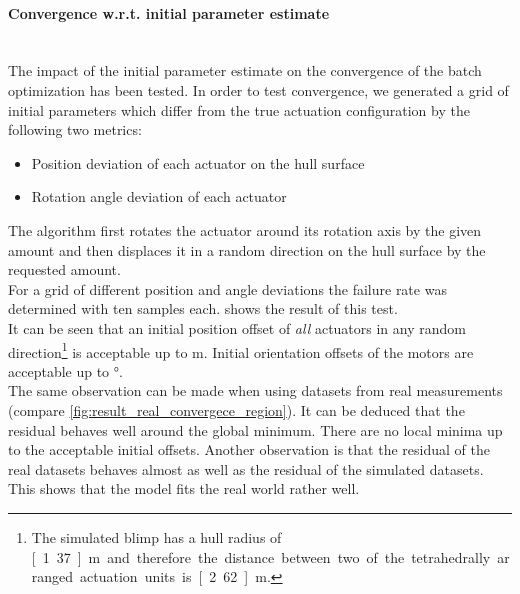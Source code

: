 \paragraph{Convergence w.r.t. initial parameter estimate} ~\\
The impact of the initial parameter estimate on the convergence of the batch optimization has been tested.
In order to test convergence, we generated a grid of initial parameters which differ from the true actuation configuration by the following two metrics:
\begin{itemize}
\item Position deviation of each actuator on the hull surface
\item Rotation angle deviation of each actuator
\end{itemize}
The algorithm first rotates the actuator around its rotation axis by the given amount and then displaces it in a random direction on the hull surface by the requested amount. \\
For a grid of different position and angle deviations the failure rate was determined with ten samples each.
 shows the result of this test.\\
It can be seen that an initial position offset of \textit{all} actuators in any random direction\footnote{
The simulated blimp has a hull radius of \unit[1.37]{m} and therefore the distance between two of the tetrahedrally arranged actuation units is \unit[2.62]{m}.}
is acceptable up to \unit[1]{m}.
Initial orientation offsets of the motors are acceptable up to \unit[120]{°}.
\\
The same observation can be made when using datasets from real measurements (compare \cref{fig:result_real_convergece_region}).
It can be deduced that the residual behaves well around the global minimum. 
There are no local minima up to the acceptable initial offsets.
Another observation is that the residual of the real datasets behaves almost as well as the residual of the simulated datasets.
This shows that the model fits the real world rather well.

